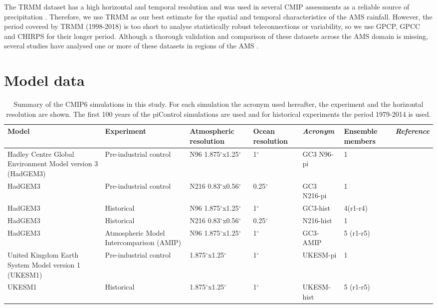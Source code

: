 The TRMM dataset has a high horizontal and temporal resolution and was used in several CMIP assessments \citep{geil2013,jones2013} as a reliable source of precipitation \citep{carvalho2012}. Therefore, we use TRMM as our best estimate for the spatial and temporal characteristics of the AMS rainfall. However,
 the period covered by TRMM (1998-2018) is too short to analyse statistically robust teleconnections or variability, so we use GPCP, GPCC and CHIRPS for their longer period. Although a thorough validation and comparison of these datasets across the AMS domain is missing, several studies have analysed  one or more of these datasets in regions of the AMS \citep[e.g.][]{franchito2009,dinku2010,trejo2016}.

\section{Model data}
\begin{sidewaystable}
\small
\caption{Summary of the CMIP6 simulations in this study. For each simulation the acronym used hereafter, the experiment and the horizontal resolution are shown. The first 100 years of the piControl simulations are used and for historical experiments the period 1979-2014 is used.}
\begin{tabular}{p{4.5cm}|p{4.5cm}p{}p{1.95cm}p{2.73cm}p{2cm}p{3.8cm}} \label{tab:Sexps} \small
 Model & Experiment & Atmospheric resolution & Ocean resolution & \textit{Acronym}  & Ensemble members & \textit{Reference}                 \\ \hline \hline

Hadley Centre Global Environment Model version 3 (HadGEM3)    &  Pre-industrial control  & N96 1.875$^\circ$x1.25$^\circ$ & 1$^\circ$ & GC3 N96-pi      & 1 &   \citep{menary2018,gc3pi}                          \\
HadGEM3   &  Pre-industrial control         & N216 0.83$^\circ$x0.56$^\circ$ &  0.25$^\circ$ & GC3 N216-pi   & 1 & \citep{menary2018,n216pi}      \\
HadGEM3    &  Historical        & N96 1.875$^\circ$x1.25$^\circ$ & 1$^\circ$  & GC3-hist     &  4(r1-r4) & \citep{andrews2020,gc3hist}                          \\
HadGEM3   &  Historical         & N216 0.83$^\circ$x0.56$^\circ$ &  0.25$^\circ$ & N216-hist   & 1 & \citep{n216pi}      \\
HadGEM3    &  Atmospheric Model Intercomparison (AMIP)  & N96 1.875$^\circ$x1.25$^\circ$ & 1$^\circ$  & GC3-AMIP     & 5 (r1-r5) &   \citep{gc3amip}                          \\
United Kingdom Earth System Model version 1 (UKESM1)   &  Pre-industrial control        & 1.875$^\circ$x1.25$^\circ$ & 1$^\circ$ & UKESM-pi      & 1 & \citep{ukesmpi}            \\
UKESM1   &  Historical         & 1.875$^\circ$x1.25$^\circ$ & 1$^\circ$ & UKESM-hist & 5 (r1-r5)     &  \citep{ukesmhist}            \\
\end{tabular}
\end{sidewaystable}

